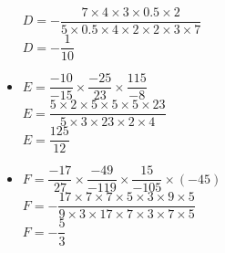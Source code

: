 \begin{corrige}
\begin{spacing}{2}
\begin{itemize}
                \mbox{\red $D=-\dfrac{7\times 4\times 3\times\num{0.5}\times 2}{5\times \num{0.5}\times 4\times 2\times 2\times 3\times 7}$}\\{\red $D=-\dfrac{1}{10}$}\\
                \item \mbox{$E=\dfrac{-10}{-15}\times\dfrac{-25}{23}\times\dfrac{115}{-8}$}\\
                \mbox{\red $E=\dfrac{5\times 2\times 5\times 5\times 5\times 23}{5\times 3\times 23\times 2\times 4}$}\\{\red $E=\dfrac{125}{12}$}\\
                \item \mbox{$F=\dfrac{-17}{27}\times\dfrac{-49}{-119}\times\dfrac{15}{-105}\times(-45)$}\\
                \mbox{\red $F=-\dfrac{17\times 7\times 7\times 5\times 3\times 9\times 5}{9\times 3\times 17\times 7\times 3\times 7\times 5}$}\\{\red $F=-\dfrac{5}{3}$}
            \end{itemize}
        \end{spacing}            
\end{corrige}

